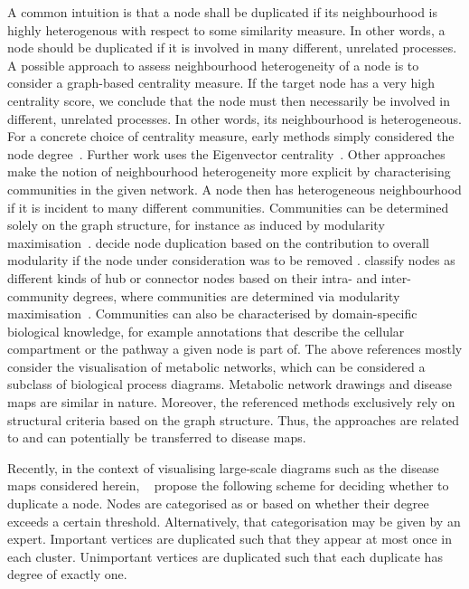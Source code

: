 \documentclass[
	fontsize=10pt, %
	twoside=true, %
	secnumdepth=1, %
  toc=indentunnumbered %
]{kaobook}
\begin{document}
A common intuition is that a node shall be duplicated if its neighbourhood is
highly heterogenous with respect to some similarity measure. In other words, a
node should be duplicated if it is involved in many different, unrelated
processes.
%
A possible approach to assess neighbourhood heterogeneity of a node is to
consider a graph-based centrality measure. If the target node has a very high
centrality score, we conclude that the node must then necessarily be involved in
different, unrelated processes. In other words, its neighbourhood is heterogeneous. For a
concrete choice of centrality measure, early methods simply considered the node
degree~\cite{ma_ReconstructionMetabolicNetworks_2003,schuster_exploring_2002}.
Further work uses the Eigenvector centrality~\cite{manipur_clustering_2020}.
%
Other approaches make the notion of neighbourhood heterogeneity more explicit by
characterising communities in the given network. A node then has heterogeneous
neighbourhood if it is incident to many different communities. Communities can
be determined solely on the graph structure, for instance as induced by
modularity maximisation~\cite{newman_modularity_2006}.
\citeauthor{huss_CurrencyCommodityMetabolites_2007} decide node duplication
based on the contribution to overall modularity if the node under consideration
was to be removed
\cite{huss_CurrencyCommodityMetabolites_2007}.
\citeauthor{guimera_FunctionalCartographyComplex_2005} classify nodes as
different kinds of hub or connector nodes based on their intra- and
inter-community degrees, where communities are determined via modularity
maximisation~\cite{guimera_FunctionalCartographyComplex_2005}. Communities can
also be characterised by domain-specific biological knowledge, for example
annotations that describe the cellular compartment
\cite{manipur_clustering_2020} or the pathway
\cite{rohrschneider_NovelGridBasedVisualization_2010,
  joshi-tope_ReactomeKnowledgebaseBiological_2005,
  lambert_PathwayPreservingRepresentation_2011} a given node is part of.
%
The above references mostly consider the visualisation of metabolic networks,
which can be considered a subclass of biological process diagrams. Metabolic
network drawings and disease maps are similar in nature. Moreover, the
referenced methods exclusively rely on structural criteria based on the graph
structure. Thus, the approaches are related to and can potentially be
transferred to disease maps.

Recently, in the context of visualising large-scale diagrams such as the disease
maps considered herein,
\citeauthor{wu_MultilevelAreaBalancing_2020}~\cite{wu_MultilevelAreaBalancing_2020}
propose the following scheme for deciding whether to duplicate a node. Nodes are
categorised as  or  based on whether their
degree exceeds a certain threshold. Alternatively, that categorisation may
be given by an expert.
% 
Important vertices are duplicated such that they appear at most once in each
cluster. Unimportant vertices are duplicated such that each duplicate has degree
of exactly one.
\end{document}
